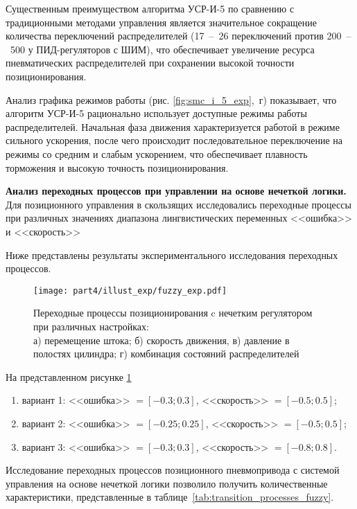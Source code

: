 Существенным преимуществом алгоритма УСР-И-5 по сравнению с традиционными методами управления является значительное сокращение
количества переключений распределителей (17~--~26 переключений против 200~--~500 у ПИД-регуляторов с ШИМ), что обеспечивает
увеличение ресурса пневматических распределителей при сохранении высокой точности позиционирования.

Анализ графика режимов работы (рис. \ref{fig:smc_i_5_exp},~г) показывает, что алгоритм УСР-И-5 рационально использует
доступные режимы работы распределителей. Начальная фаза движения характеризуется работой в режиме сильного ускорения,
после чего происходит последовательное переключение на режимы со средним и
слабым ускорением, что обеспечивает плавность торможения и высокую точность позиционирования.

\textbf{Анализ переходных процессов при управлении на основе нечеткой логики.}
Для позиционного управления в скользящих исследовались переходные процессы при различных значениях
диапазона лингвистических переменных <<ошибка>> и <<скорость>>

Ниже представлены результаты экспериментального исследования переходных процессов.

\begin{figure}
	\centering
	\texttt{[image: part4/illust\_exp/fuzzy\_exp.pdf]}
	\caption{Переходные процессы позиционирования c нечетким регулятором при различных настройках:\\
		а) перемещение штока; б) скорость движения, в) давление в полостях цилиндра; г) комбинация состояний распределителей}
	\label{fig:fuzzy_exp}
\end{figure}

На представленном рисунке \ref{fig:fuzzy_exp}
\begin{enumerate}
	\item вариант 1: <<ошибка>> $=[-\num{0.3};\num{0.3}]$, <<скорость>> $=[\num{-0.5};\num{0.5}]$;
	\item вариант 2: <<ошибка>> $=[-\num{0.25};\num{0.25}]$, <<скорость>> $=[\num{-0.5};\num{0.5}]$;
	\item вариант 3: <<ошибка>> $=[-\num{0.3};\num{0.3}]$, <<скорость>> $=[\num{-0.8};\num{0.8}]$.
\end{enumerate}

Исследование переходных процессов позиционного пневмопривода с системой управления на основе нечеткой
логики позволило получить количественные характеристики, представленные в таблице~\ref{tab:transition_processes_fuzzy}.


